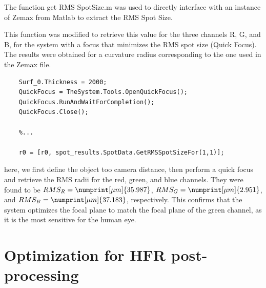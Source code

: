 \documentclass[10pt,letterpaper]{article}
\begin{document}
The function get \textunderscore RMS \textunderscore SpotSize.m was used to directly interface with an instance of Zemax from Matlab to extract the RMS Spot Size. 

This function was modified to retrieve this value for the three channels R, G, and B, for the system with a focus that minimizes the RMS spot size (Quick Focus). The results were obtained for a curvature radius corresponding to the one used in the Zemax file.

\begin{verbatim}
    Surf_0.Thickness = 2000;
    QuickFocus = TheSystem.Tools.OpenQuickFocus();
    QuickFocus.RunAndWaitForCompletion();
    QuickFocus.Close();

    %...

    r0 = [r0, spot_results.SpotData.GetRMSSpotSizeFor(1,1)];
\end{verbatim}

here, we first define the object too camera distance, then perform a quick focus and retrieve the RMS radii for the red, green, and blue channels. They were found to be $RMS_R = \numprint[\mu m]{35.987}$, $RMS_G = \numprint[\mu m]{2.951}$, and $RMS_B = \numprint[\mu m]{37.183}$, respectively. This confirms that the system optimizes the focal plane to match the focal plane of the green channel, as it is the most sensitive for the human eye.

\section{Optimization for HFR post-processing}














\listoffigures
\end{document}
